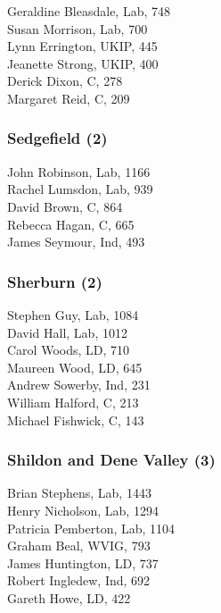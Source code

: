 \documentclass[a4paper,openany,10pt]{book}
\begin{document}
Geraldine Bleasdale, Lab, 748\\
Susan Morrison, Lab, 700\\
Lynn Errington, UKIP, 445\\
Jeanette Strong, UKIP, 400\\
Derick Dixon, C, 278\\
Margaret Reid, C, 209\\


\subsubsection*{Sedgefield (2)}



John Robinson, Lab, 1166\\
Rachel Lumsdon, Lab, 939\\
David Brown, C, 864\\
Rebecca Hagan, C, 665\\
James Seymour, Ind, 493\\


\subsubsection*{Sherburn (2)}



Stephen Guy, Lab, 1084\\
David Hall, Lab, 1012\\
Carol Woods, LD, 710\\
Maureen Wood, LD, 645\\
Andrew Sowerby, Ind, 231\\
William Halford, C, 213\\
Michael Fishwick, C, 143\\


\subsubsection*{Shildon and Dene Valley (3)}



Brian Stephens, Lab, 1443\\
Henry Nicholson, Lab, 1294\\
Patricia Pemberton, Lab, 1104\\
Graham Beal, WVIG, 793\\
James Huntington, LD, 737\\
Robert Ingledew, Ind, 692\\
Gareth Howe, LD, 422\\
\end{document}
